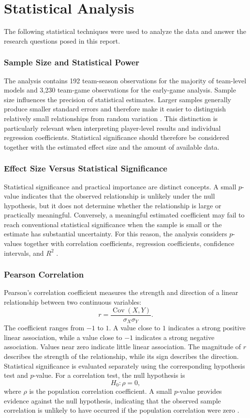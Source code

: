 \documentclass[11pt]{article}
\begin{document}
\section*{Statistical Analysis}
The following statistical techniques were used to analyze the data and answer the research questions posed in this report.

\subsubsection*{Sample Size and Statistical Power} 
The analysis contains 192 team-season observations for the majority of team-level models and 3,230 team-game observations for the early-game analysis. Sample size influences the precision of statistical estimates. Larger samples generally produce smaller standard errors and therefore make it easier to distinguish relatively small relationships from random variation \cite{samplesize}. This distinction is particularly relevant when interpreting player-level results and individual regression coefficients. Statistical significance should therefore be considered together with the estimated effect size and the amount of available data.

\subsubsection*{Effect Size Versus Statistical Significance} 
Statistical significance and practical importance are distinct concepts. A small $p$-value indicates that the observed relationship is unlikely under the null hypothesis, but it does not determine whether the relationship is large or practically meaningful. Conversely, a meaningful estimated coefficient may fail to reach conventional statistical significance when the sample is small or the estimate has substantial uncertainty. For this reason, the analysis considers $p$-values together with correlation coefficients, regression coefficients, confidence intervals, and $R^2$ \cite{pvalue}. 

\subsubsection*{Pearson Correlation} 
Pearson's correlation coefficient measures the strength and direction of a linear relationship between two continuous variables: \[ r = \frac{\operatorname{Cov}(X,Y)} {\sigma_X\sigma_Y}. \] The coefficient ranges from $-1$ to $1$. A value close to $1$ indicates a strong positive linear association, while a value close to $-1$ indicates a strong negative association. Values near zero indicate little linear association. The magnitude of $r$ describes the strength of the relationship, while its sign describes the direction. Statistical significance is evaluated separately using the corresponding hypothesis test and $p$-value. For a correlation test, the null hypothesis is \[ H_0:\rho=0, \] where $\rho$ is the population correlation coefficient. A small $p$-value provides evidence against the null hypothesis, indicating that the observed sample correlation is unlikely to have occurred if the population correlation were zero \cite{pearsoncorr}.
\end{document}
